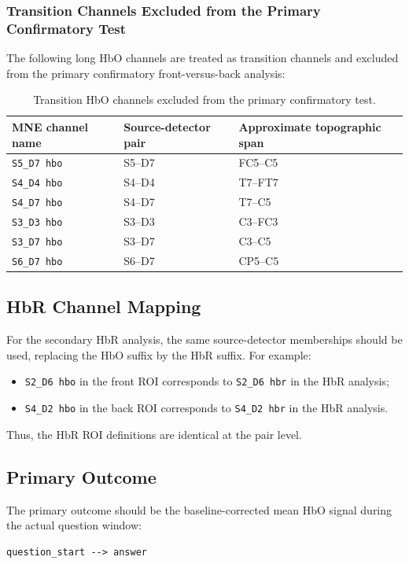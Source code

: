 \subsubsection{Transition Channels Excluded from the Primary Confirmatory Test}
The following long HbO channels are treated as transition channels and excluded from the primary
confirmatory front-versus-back analysis:

\begin{table}[ht]
\centering
\caption{Transition HbO channels excluded from the primary confirmatory test.}
\label{tab:transition_hbo}
\begin{tabular}{lll}
\hline
MNE channel name & Source-detector pair & Approximate topographic span \\
\hline
\texttt{S5\_D7 hbo} & S5--D7 & FC5--C5 \\
\texttt{S4\_D4 hbo} & S4--D4 & T7--FT7 \\
\texttt{S4\_D7 hbo} & S4--D7 & T7--C5 \\
\texttt{S3\_D3 hbo} & S3--D3 & C3--FC3 \\
\texttt{S3\_D7 hbo} & S3--D7 & C3--C5 \\
\texttt{S6\_D7 hbo} & S6--D7 & CP5--C5 \\
\hline
\end{tabular}
\end{table}

\subsection{HbR Channel Mapping}
For the secondary HbR analysis, the same source-detector memberships should be used, replacing
the HbO suffix by the HbR suffix.
For example:
\begin{itemize}
    \item \texttt{S2\_D6 hbo} in the front ROI corresponds to \texttt{S2\_D6 hbr} in the HbR analysis;
    \item \texttt{S4\_D2 hbo} in the back ROI corresponds to \texttt{S4\_D2 hbr} in the HbR analysis.
\end{itemize}

Thus, the HbR ROI definitions are identical at the pair level.

\subsection{Primary Outcome}
The primary outcome should be the baseline-corrected mean HbO signal during the actual question window:
\begin{verbatim}
question_start --> answer
\end{verbatim}

